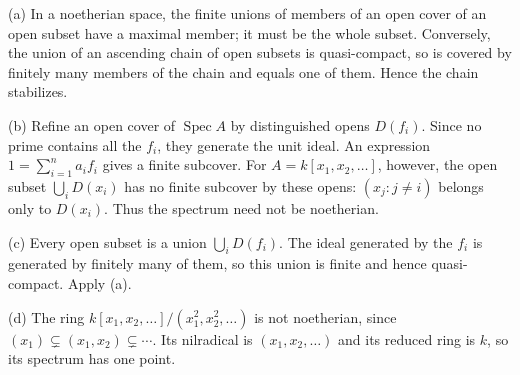 (a) In a noetherian space, the finite unions of members of an open cover of an open subset have a maximal member; it must be the whole subset. Conversely, the union of an ascending chain of open subsets is quasi-compact, so is covered by finitely many members of the chain and equals one of them. Hence the chain stabilizes.

(b) Refine an open cover of $\operatorname{Spec}A$ by distinguished opens $D(f_i)$. Since no prime contains all the $f_i$, they generate the unit ideal. An expression $1=\sum_{i=1}^na_if_i$ gives a finite subcover. For $A=k[x_1,x_2,\ldots]$, however, the open subset $\bigcup_iD(x_i)$ has no finite subcover by these opens: $(x_j:j\ne i)$ belongs only to $D(x_i)$. Thus the spectrum need not be noetherian.

(c) Every open subset is a union $\bigcup_iD(f_i)$. The ideal generated by the $f_i$ is generated by finitely many of them, so this union is finite and hence quasi-compact. Apply (a).

(d) The ring $k[x_1,x_2,\ldots]/(x_1^2,x_2^2,\ldots)$ is not noetherian, since $(x_1)\subsetneq(x_1,x_2)\subsetneq\cdots$. Its nilradical is $(x_1,x_2,\ldots)$ and its reduced ring is $k$, so its spectrum has one point.
